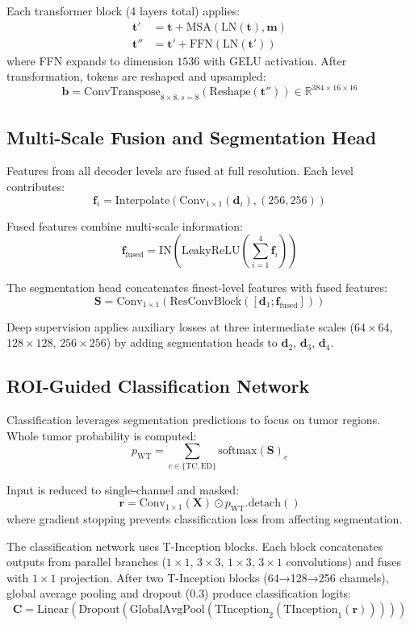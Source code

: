 \documentclass[runningheads]{llncs}
\begin{document}
Each transformer block (4 layers total) applies:
\begin{align*}
\mathbf{t}' &= \mathbf{t} + \text{MSA}(\text{LN}(\mathbf{t}), \mathbf{m}) \\
\mathbf{t}'' &= \mathbf{t}' + \text{FFN}(\text{LN}(\mathbf{t}'))
\end{align*}
where FFN expands to dimension $1536$ with GELU activation. After transformation, tokens are reshaped and upsampled:
\[
\mathbf{b} = \text{ConvTranspose}_{8\times 8, s=8}(\text{Reshape}(\mathbf{t}'')) \in \mathbb{R}^{384 \times 16 \times 16}
\]

\subsection{Multi-Scale Fusion and Segmentation Head}

Features from all decoder levels are fused at full resolution. Each level contributes:
\[
\mathbf{f}_i = \text{Interpolate}(\text{Conv}_{1\times1}(\mathbf{d}_i), (256, 256))
\]

Fused features combine multi-scale information:
\[
\mathbf{f}_{\text{fused}} = \text{IN}(\text{LeakyReLU}(\sum_{i=1}^{4} \mathbf{f}_i))
\]

The segmentation head concatenates finest-level features with fused features:
\[
\mathbf{S} = \text{Conv}_{1\times1}(\text{ResConvBlock}([\mathbf{d}_1; \mathbf{f}_{\text{fused}}]))
\]

Deep supervision applies auxiliary losses at three intermediate scales ($64\times64$, $128\times128$, $256\times256$) by adding segmentation heads to $\mathbf{d}_2$, $\mathbf{d}_3$, $\mathbf{d}_4$.

\subsection{ROI-Guided Classification Network}

Classification leverages segmentation predictions to focus on tumor regions. Whole tumor probability is computed:
\[
p_{\text{WT}} = \sum_{c \in \{\text{TC}, \text{ED}\}} \text{softmax}(\mathbf{S})_c
\]

Input is reduced to single-channel and masked:
\[
\mathbf{r} = \text{Conv}_{1\times1}(\mathbf{X}) \odot p_{\text{WT}}.\text{detach}()
\]
where gradient stopping prevents classification loss from affecting segmentation.

The classification network uses T-Inception blocks. Each block concatenates outputs from parallel branches ($1\times1$, $3\times3$, $1\times3$, $3\times1$ convolutions) and fuses with $1\times1$ projection. After two T-Inception blocks (64→128→256 channels), global average pooling and dropout (0.3) produce classification logits:
\[
\mathbf{C} = \text{Linear}(\text{Dropout}(\text{GlobalAvgPool}(\text{TInception}_2(\text{TInception}_1(\mathbf{r})))))
\]
\end{document}
